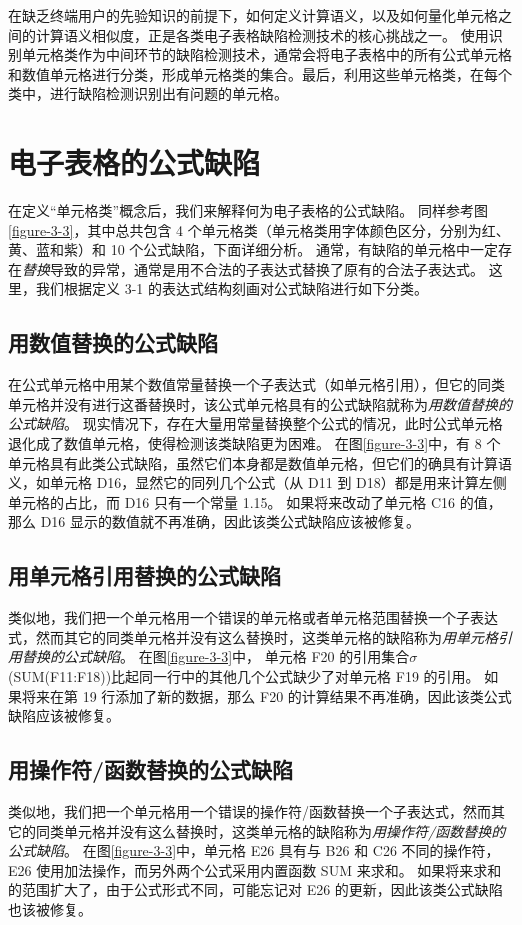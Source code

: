 

在缺乏终端用户的先验知识的前提下，如何定义计算语义，以及如何量化单元格之间的计算语义相似度，正是各类电子表格缺陷检测技术的核心挑战之一\cite{Barowy2018excelint}。
使用识别单元格类作为中间环节的缺陷检测技术，通常会将电子表格中的所有公式单元格和数值单元格进行分类，形成单元格类的集合。最后，利用这些单元格类，在每个类中，进行缺陷检测识别出有问题的单元格。


\section{电子表格的公式缺陷}
在定义“单元格类”概念后，我们来解释何为电子表格的公式缺陷。
同样参考图\ref{figure-3-3}，其中总共包含 4 个单元格类（单元格类用字体颜色区分，分别为红、黄、蓝和紫）和 10 个公式缺陷，下面详细分析。
通常，有缺陷的单元格中一定存在\textit{替换}导致的异常，通常是用不合法的子表达式替换了原有的合法子表达式。
这里，我们根据定义 3-1 的表达式结构刻画对公式缺陷进行如下分类。

\subsection{用数值替换的公式缺陷}
在公式单元格中用某个数值常量替换一个子表达式（如单元格引用），但它的同类单元格并没有进行这番替换时，该公式单元格具有的公式缺陷就称为\textit{用数值替换的公式缺陷}。
现实情况下，存在大量用常量替换整个公式的情况，此时公式单元格退化成了数值单元格，使得检测该类缺陷更为困难。
在图\ref{figure-3-3}中，有 8 个单元格具有此类公式缺陷，虽然它们本身都是数值单元格，但它们的确具有计算语义，如单元格 D16，显然它的同列几个公式（从 D11 到 D18）都是用来计算左侧单元格的占比，而 D16 只有一个常量 1.15。
如果将来改动了单元格 C16 的值，那么 D16 显示的数值就不再准确，因此该类公式缺陷应该被修复。

\subsection{用单元格引用替换的公式缺陷}
类似地，我们把一个单元格用一个错误的单元格或者单元格范围替换一个子表达式，然而其它的同类单元格并没有这么替换时，这类单元格的缺陷称为\textit{用单元格引用替换的公式缺陷}。
在图\ref{figure-3-3}中， 单元格 F20 的引用集合$\sigma$(SUM(F11:F18))比起同一行中的其他几个公式缺少了对单元格 F19 的引用。
如果将来在第 19 行添加了新的数据，那么 F20 的计算结果不再准确，因此该类公式缺陷应该被修复。

\subsection{用操作符/函数替换的公式缺陷}
类似地，我们把一个单元格用一个错误的操作符/函数替换一个子表达式，然而其它的同类单元格并没有这么替换时，这类单元格的缺陷称为\textit{用操作符/函数替换的公式缺陷}。
在图\ref{figure-3-3}中，单元格 E26 具有与 B26 和 C26 不同的操作符，E26 使用加法操作，而另外两个公式采用内置函数 SUM 来求和。
如果将来求和的范围扩大了，由于公式形式不同，可能忘记对 E26 的更新，因此该类公式缺陷也该被修复。

